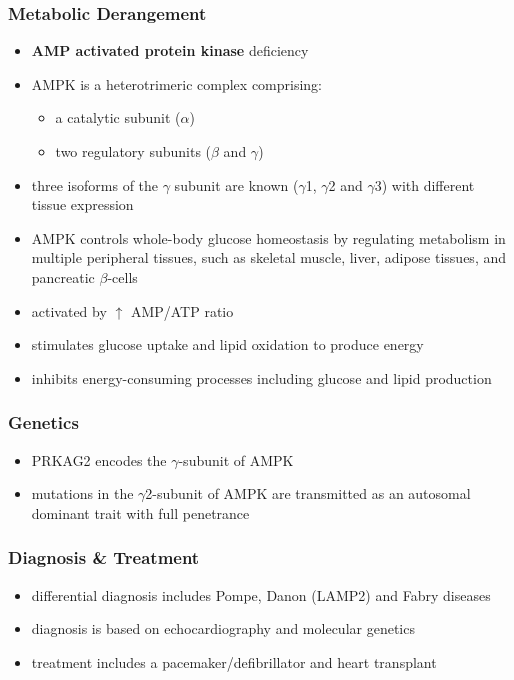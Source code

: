 \documentclass[12pt]{scrartcl}
\begin{document}
\subsubsection{Metabolic Derangement}
\label{sec:org3a065ea}
\begin{itemize}
\item \textbf{AMP activated protein kinase} deficiency
\item AMPK is a heterotrimeric complex comprising:
\begin{itemize}
\item a catalytic subunit (\(\alpha\))
\item two regulatory subunits (\(\beta\) and \(\gamma\))
\end{itemize}
\item three isoforms of the \(\gamma\) subunit are known (\(\gamma\)1, \(\gamma\)2 and \(\gamma\)3) with different tissue
expression
\item AMPK controls whole-body glucose homeostasis by regulating metabolism in multiple peripheral tissues, such as
skeletal muscle, liver, adipose tissues, and pancreatic \(\beta\)-cells
\item activated by \(\uparrow\) AMP/ATP ratio
\item stimulates glucose uptake and lipid oxidation to produce energy
\item inhibits energy-consuming processes including glucose and lipid production
\end{itemize}
\subsubsection{Genetics}
\label{sec:org6a9d508}
\begin{itemize}
\item PRKAG2 encodes the \(\gamma\)-subunit of AMPK
\item mutations in the \(\gamma\)2-subunit of AMPK are transmitted as an
autosomal dominant trait with full penetrance
\end{itemize}

\subsubsection{Diagnosis \& Treatment}
\label{sec:org39c1dea}
\begin{itemize}
\item differential diagnosis includes Pompe, Danon (LAMP2) and Fabry diseases
\item diagnosis is based on echocardiography and molecular genetics
\item treatment includes a pacemaker/defibrillator and heart transplant
\end{itemize}
\end{document}
